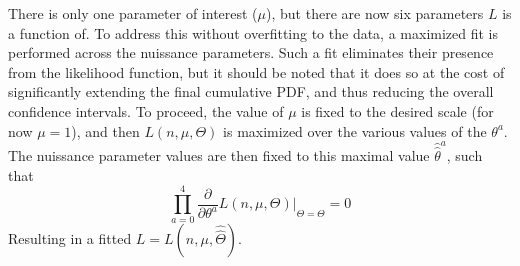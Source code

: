     There is only one parameter of interest ($\mu$), but there are now six parameters $L$ is a function of.
    To address this without overfitting to the data, a maximized fit is performed across the nuissance parameters.
    Such a fit eliminates their presence from the likelihood function,
        but it should be noted that it does so at the cost of significantly extending the final cumulative PDF,
        and thus reducing the overall confidence intervals.
    To proceed, the value of $\mu$ is fixed to the desired scale (for now $\mu=1$),
        and then $L(n,\mu,\Theta)$ is maximized over the various values of the $\theta^a$.
    The nuissance parameter values are then fixed to this maximal value $\hat{\hat\theta}^a$, such that
    \begin{equation}
        \prod \limits_{a=0}^{4} \frac{\partial}{\partial \theta^a} L(n,\mu,\Theta) |_{\Theta=\hat{\hat\Theta}} = 0
    \end{equation}
    Resulting in a fitted $L = L(n,\mu,\hat{\hat\Theta})$.
        
